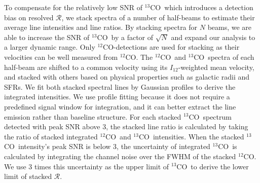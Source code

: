 \documentclass{emulateapj}
\def\ttco{\mbox{$^{13}$CO}}
\def\twco{\mbox{$^{12}$CO}}
\def\rtt{$\mathcal{R}$}
\def\itw{$I_{12}$}
\begin{document}
\begin{figure*}
\caption{
Resolved  and stacked \rtt \ as a function of \itw. 
The first 11 panels show the results for each individual galaxy, excluding NGC 1569. 
Small colored circles show the ratios for individual half-beams 
with \rtt \ detected; the filled ones show the half-beams in \itw \ bins with 
detection fraction greater than $50\%$, and the open ones show the half-beams 
in \itw \ bins with lower detection fraction. 
The gray scales show the distribution of 
\rtt$_{\rm min} = $\itw$/3\sigma_{13}$ for half-beams with \twco \ detected 
but \rtt \ not detected.  
The black large circles and arrows are the stacked \rtt \ and lower limits 
in each \itw bin respectively; 
the horizontal error bars reflect the bin size, and the vertical error bars 
show their uncertainties. 
The last panel is a summary plot showing stacked \rtt \ 
with different colors representing different galaxies.
}
\label{fig:r13vsi12}
\end{figure*}

To compensate for the relatively low SNR of \ttco \ which introduces a  detection bias on resolved \rtt, we stack spectra of a number of half-beams to estimate their average line intensities and line ratios. 
By stacking spectra for $N$ beams, we are able to increase  the SNR of \ttco \ by a factor of $\sqrt{N}$ 
and expand our analysis to a larger dynamic range.
Only \twco-detections are used for stacking as their velocities can be well measured from \twco. 
The \twco \ and \ttco \  spectra of each half-beam are shifted to a common velocity using its \itw-weighted mean velocity, and stacked with others based on physical properties such as galactic radii and SFRs.     
We fit both stacked spectral lines by Gaussian profiles 
to derive the integrated intensities. We use profile fitting because it does not require a predefined signal window for integration, and it can better extract the line emission rather than baseline structure.  
For each stacked \ttco \ spectrum detected with peak SNR above 3, 
the stacked line ratio is calculated by taking the ratio of stacked integrated \twco \ and \ttco \ intensities. 
When the stacked \ttco \ intensity's peak SNR is below 3, the uncertainty of integrated \ttco \ is calculated by integrating the channel noise over the FWHM of the stacked \twco.  We use 3 times this uncertainty as the upper limit of \ttco \ to derive the lower limit of stacked \rtt.
\end{document}
